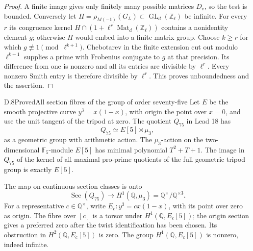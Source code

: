 \begin{proof}
A finite image gives only finitely many possible matrices
\(D_v\), so the test is bounded. Conversely let
\(H=\rho_{M(-1)}(G_L)\subset\operatorname{GL}_d(\mathbb Z_\ell)\)
be infinite. For every \(r\) its congruence kernel
\(H\cap(1+\ell^r\operatorname{Mat}_d(\mathbb Z_\ell))\)
contains a nonidentity element \(g\); otherwise \(H\) would
embed into a finite matrix group. Choose \(k\ge r\) for which
\(g\not\equiv1\pmod{\ell^{k+1}}\). Chebotarev in the finite
extension cut out modulo \(\ell^{k+1}\) supplies a prime with
Frobenius conjugate to \(g\) at that precision. Its difference
from one is nonzero and all its entries are divisible by
\(\ell^r\). Every nonzero Smith entry is therefore divisible
by \(\ell^r\). This proves unboundedness and the assertion.
\end{proof}

\begin{statement}{D.8}{Proved}{All section fibres of the group of order seventy-five}
Let \(E\) be the smooth projective curve \(y^3=x(1-x)\), with
origin the point over \(x=0\), and use the unit tangent of the
tripod at zero. The quotient \(Q_{75}\) in Lead 18 has
\[
Q_{75}\simeq E[5]\rtimes\mu_3,
\]
as a geometric group with arithmetic action. The \(\mu_3\)-action
on the two-dimensional \(\mathbb F_5\)-module \(E[5]\) has
minimal polynomial \(T^2+T+1\). The image in \(Q_{75}\) of the
kernel of all maximal pro-prime quotients of the full geometric
tripod group is exactly \(E[5]\).

The map on continuous section classes is onto
\[
\operatorname{Sec}(Q_{75})\longrightarrow
H^1(\mathbb Q,\mu_3)=\mathbb Q^\times/\mathbb Q^{\times3}.
\]
For a representative \(c\in\mathbb Q^\times\), write
\(E_c:y^3=cx(1-x)\), with its point over zero as origin.
The fibre over \([c]\) is a torsor under
\(H^1(\mathbb Q,E_c[5])\); the origin section gives a preferred
zero after the twist identification has been chosen. Its
obstruction in \(H^2(\mathbb Q,E_c[5])\) is zero.
The group \(H^1(\mathbb Q,E_c[5])\) is nonzero, indeed infinite.
\end{statement}
